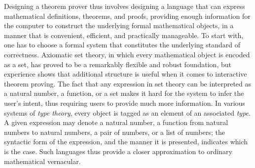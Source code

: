 \documentclass[11pt]{article}
\begin{document}
Designing a theorem prover thus involves designing a language that can express mathematical definitions, theorems, and proofs, providing enough information for the computer to construct the underlying formal mathematical objects, in a manner that is convenient, efficient, and practically manageable. To start with, one has to choose a formal system that constitutes the underlying standard of correctness. Axiomatic set theory, in which every mathematical object is encoded as a set, has proved to be a remarkably flexible and robust foundation, but experience shows that additional structure is useful when it comes to interactive theorem proving. The fact that any expression in set theory can be interpreted as a natural number, a function, or a set makes it hard for the system to infer the user's intent, thus requiring users to provide much more information. In various systems of \emph{type theory}, every object is tagged as an element of an associated \emph{type}. A given expression may denote a natural number, a function from natural numbers to natural numbers, a pair of numbers, or a list of numbers; the syntactic form of the expression, and the manner it is presented, indicates which is the case. Such languages thus provide a closer approximation to ordinary mathematical vernacular.
\end{document}
